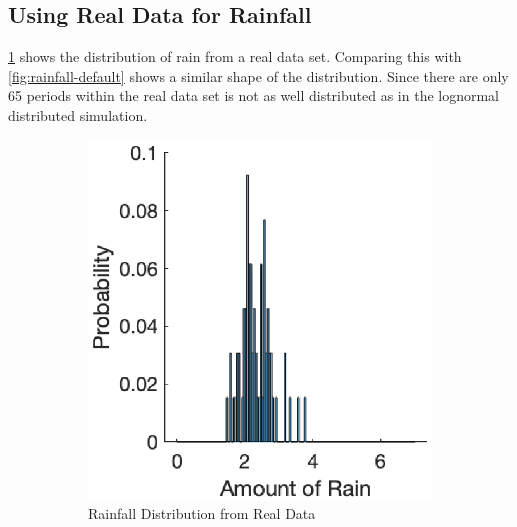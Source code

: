 \documentclass[12pt, a4paper, oneside]{article}
\begin{document}
\subsection{Using Real Data for Rainfall}
\ref{fig:rainfall-real-data} shows the distribution of rain from a real data set. 
Comparing this with \ref{fig:rainfall-default} shows a similar shape of the distribution. 
Since there are only 65 periods within the real data set is not as well distributed as in the lognormal distributed simulation.
\begin{figure}[h]
\begin{subfigure}{0.5\textwidth}
	\centering
	\includegraphics[width=1\textwidth]{figures/rainfall-real-data.eps}
	\caption{Rainfall Distribution from Real Data}
	\label{fig:rainfall-real-data}
\end{subfigure}%
\begin{subfigure}{.5\textwidth}
	\centering

\end{subfigure}
\end{figure}
\end{document}
